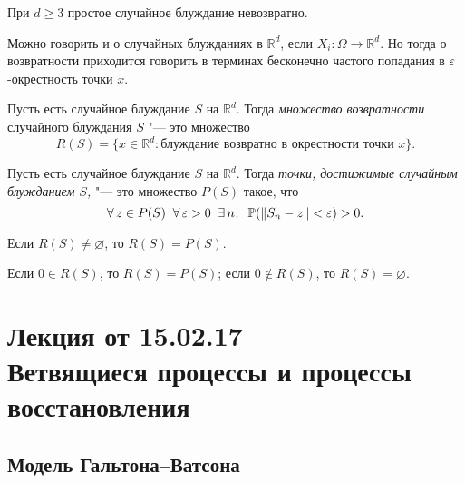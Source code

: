 \begin{cor}
	При $d \geqslant 3$ простое случайное блуждание невозвратно.
\end{cor}

\begin{note}
	\sloppy
	Можно говорить и о случайных блужданиях в $\mathbb{R}^d$, если $X_{i}: \Omega \to \mathbb{R}^d$.
Но тогда о возвратности приходится говорить в терминах бесконечно частого попадания в $\varepsilon$-окрестность точки $x$.
\end{note}

\begin{df}
	Пусть есть случайное блуждание $S$ на $\mathbb{R}^d$.
Тогда \emph{множество возвратности} случайного блуждания $S$ "--- это множество
	\begin{equation*}
		R(S) = \lbrace x \in \mathbb{R}^d : \text{блуждание возвратно в окрестности точки } x \rbrace \text{.}
	\end{equation*}
\end{df}

\begin{df}
	Пусть есть случайное блуждание $S$ на $\mathbb{R}^d$.
Тогда \emph{точки, достижимые случайным блужданием $S$,} "--- это множество $P(S)$ такое, что
	\begin{equation*}
		\forall\, z \in P(S) \; \; \forall\, \varepsilon > 0 \; \; \exists\, n \negmedspace : \; \, \mathbb{P}( \| S_{n} - z \| < \varepsilon) > 0 \text{.}
	\end{equation*}
\end{df}

\begin{theorem}
	Если $R(S) \neq \varnothing$, то $R(S) = P(S)$.
\end{theorem}

\begin{cor}
	Если $0 \in R(S)$, то $R(S) = P(S)$; если
	$0 \notin R(S)$, то	$R(S) = \varnothing$.
\end{cor}

\section[Лекция от 15.02.17.
Ветвящиеся процессы и процессы восстановления]{Лекция от 15.02.17\\ {\large Ветвящиеся процессы и процессы восстановления}}

\subsection{Модель Гальтона--Ватсона}


